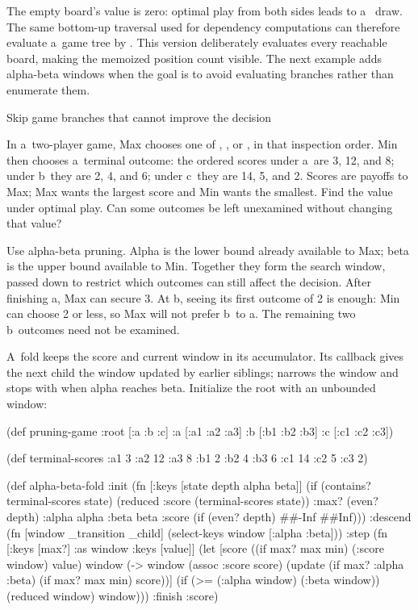 {{{The empty board's value is zero: optimal play from both sides leads to a~
draw. The same bottom-up traversal used for dependency computations can
therefore evaluate a~game tree by
.
This version deliberately evaluates every reachable board, making the
memoized position count visible. The next example adds alpha-beta windows
when the goal is to avoid evaluating branches rather than enumerate them.

\secc Skip game branches that cannot improve the decision

 In a~two-player game, Max chooses one of
, , or , in that inspection order. Min then
chooses a~terminal outcome: the ordered scores under a~are 3, 12, and 8;
under b~they are 2, 4, and 6; under c~they are 14, 5, and 2. Scores are
payoffs to Max; Max wants the largest score and Min wants the smallest.
Find the value under optimal play. Can some outcomes be left unexamined
without changing that value?

\smallskip
{} Use alpha-beta pruning. Alpha is the lower bound
already available to Max; beta is the upper bound available to Min.
Together they form the search window, passed down to restrict which
outcomes can still affect the decision.
After finishing a, Max can secure 3. At b, seeing its first outcome of 2
is enough: Min can choose 2 or less, so Max will not prefer b~to a.
The remaining two b~outcomes need not be examined.

A~fold keeps the score and current window in its accumulator. Its
 callback gives the next child the window updated by earlier
siblings;  narrows the window and stops with 
when alpha reaches beta. Initialize the root with an unbounded window:

\begtt {}
(def pruning-game
  {:root [:a :b :c]
   :a [:a1 :a2 :a3]
   :b [:b1 :b2 :b3]
   :c [:c1 :c2 :c3]})

(def terminal-scores
  {:a1 3 :a2 12 :a3 8
   :b1 2 :b2 4 :b3 6
   :c1 14 :c2 5 :c3 2})

(def alpha-beta-fold
  {:init (fn [{:keys [state depth alpha beta]}]
           (if (contains? terminal-scores state)
             (reduced {:score (terminal-scores state)})
             {:max? (even? depth)
              :alpha alpha :beta beta
              :score (if (even? depth) ##-Inf ##Inf)}))
   :descend (fn [window _transition _child]
              (select-keys window [:alpha :beta]))
   :step (fn [{:keys [max?] :as window} {:keys [value]}]
           (let [score ((if max? max min) (:score window) value)
                 window (-> window
                            (assoc :score score)
                            (update (if max? :alpha :beta)
                                    (if max? max min) score))]
             (if (>= (:alpha window) (:beta window))
               (reduced window)
               window)))
   :finish :score})

}}}
